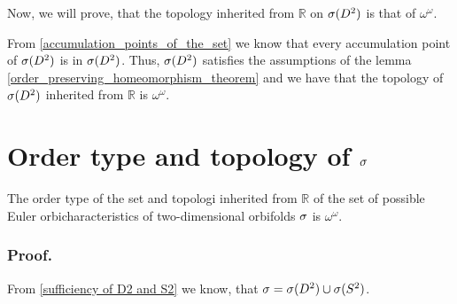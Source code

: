 %
%

Now, we will prove, that the topology inherited from $\mathbb{R}$ 
on ${{\sigma}(D^2)}$ is that of $\omega^\omega$.

From \ref{accumulation_points_of_the_set} we know that every accumulation point 
of ${{\sigma}(D^2)}$ is in ${{\sigma}(D^2)}$. 
Thus, ${{\sigma}(D^2)}$ satisfies the assumptions of the lemma \ref{order_preserving_homeomorphism_theorem} 
and 
we have that 
the topology of ${{\sigma}(D^2)}$ inherited from $\mathbb{R}$ is $\omega^\omega$. 













\section{Order type and topology of ${\sigma}$}
\begin{theorem}
The order type of the set and topologi inherited from $\mathbb{R}$ 
of the set of possible Euler orbicharacteristics of two-dimensional orbifolds  
${\sigma}$ is $\omega^\omega$. 
\end{theorem}
\subsubsection{Proof.}
From \ref{sufficiency of D2 and S2}
we know, that ${\sigma} = {{\sigma}(D^2)} \cup {{\sigma}(S^2)}$.

